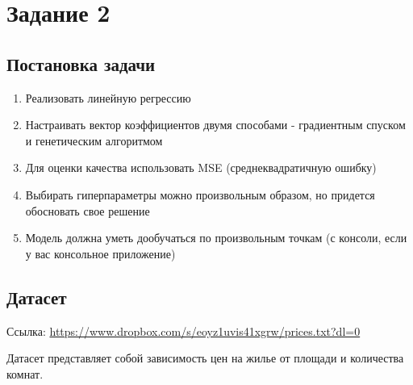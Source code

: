 \documentclass[a4paper, unicode]{article}
\begin{document}
\section{Задание 2}
\label{sec:orgheadline10}
\subsection{Постановка задачи}
\label{sec:orgheadline6}
\begin{enumerate}
\item Реализовать линейную регрессию
\item Настраивать вектор коэффициентов двумя способами - градиентным спуском и
генетическим алгоритмом
\item Для оценки качества использовать MSE (среднеквадратичную ошибку)
\item Выбирать гиперпараметры можно произвольным образом, но придется обосновать
свое решение
\item Модель должна уметь дообучаться по произвольным точкам (с консоли, если у вас
консольное приложение)
\end{enumerate}
\subsection{Датасет}
\label{sec:orgheadline7}
Ссылка: \url{https://www.dropbox.com/s/eoyz1uvis41xgrw/prices.txt?dl=0}

Датасет представляет собой зависимость цен на жилье от площади и количества
комнат.
\end{document}
